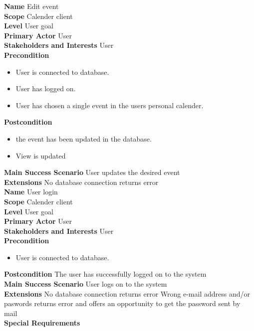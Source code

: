 \documentclass[a4paper,10pt,titlepage]{article}
\begin{document}
	\textbf{Name}
	Edit event
	\\
	\textbf{Scope}
	Calender client
	\\
	\textbf{Level}
	User goal
	\\
	\textbf{Primary Actor}
	User
	\\
	\textbf{Stakeholders and Interests}
	User
	\\
	\textbf{Precondition}
				\begin{itemize}
				\item User is connected to database.
				\item User has logged on.
				\item User has chosen a single event in the users personal calender.
				\end{itemize}
	\textbf{Postcondition}
		\begin{itemize}
				\item the event has been updated in the database.
				\item View is updated
		\end{itemize}
	\textbf{Main Success Scenario}
	User updates the desired event
	\\
	\textbf{Extensions}
	No database connection returns error
	\\
	
	\textbf{Name}
	User login
	\\
	\textbf{Scope}
	Calender client
	\\
	\textbf{Level}
	User goal
	\\
	\textbf{Primary Actor}
	User
	\\
	\textbf{Stakeholders and Interests}
	User
	\\
	\textbf{Precondition}
				\begin{itemize}
				\item User is connected to database.
				\end{itemize}
	\textbf{Postcondition}
	The user has successfully logged on to the system
	\\
	\textbf{Main Success Scenario}
	User logs on to the system
	\\
	\textbf{Extensions}
	No database connection returns error
	Wrong e-mail address and/or paswords returns error and offers an opportunity to get the password sent by mail
	\\
	\textbf{Special Requirements}
	\\
	
\end{document}
